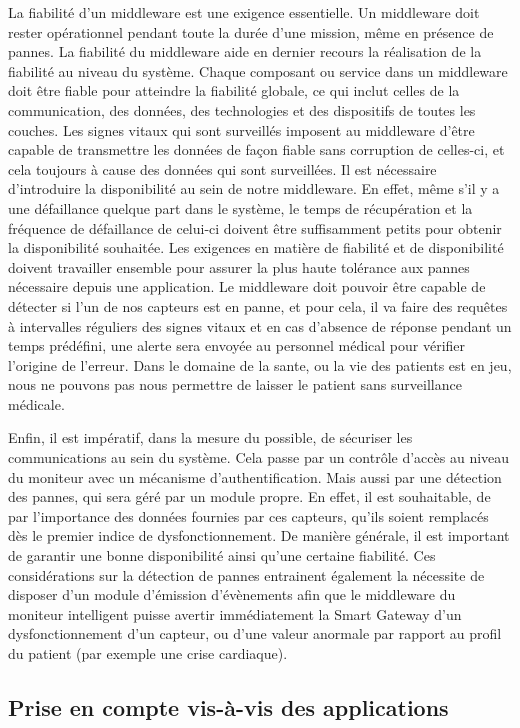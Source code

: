 La fiabilité d’un middleware est une exigence essentielle. Un middleware doit rester opérationnel pendant toute la durée d’une mission, même en présence de pannes. La fiabilité du middleware aide en dernier recours la réalisation de la fiabilité au niveau du système. Chaque composant ou service dans un middleware doit être fiable pour atteindre la fiabilité globale, ce qui inclut celles de la communication, des données, des technologies et des dispositifs de toutes les couches. Les signes vitaux qui sont surveillés imposent au middleware d’être capable de transmettre les données de façon fiable sans corruption de celles-ci, et cela toujours à cause des données qui sont surveillées. Il est nécessaire d’introduire la disponibilité au sein de notre middleware. En effet, même s’il y a une défaillance quelque part dans le système, le temps de récupération et la fréquence de défaillance de celui-ci doivent être suffisamment petits pour obtenir la disponibilité souhaitée. Les exigences en matière de fiabilité et de disponibilité doivent travailler ensemble pour assurer la plus haute tolérance aux pannes nécessaire depuis une application. Le middleware doit pouvoir être capable de détecter si l’un de nos capteurs est en panne, et pour cela, il va faire des requêtes à intervalles réguliers des signes vitaux et en cas d’absence de réponse pendant un temps prédéfini, une alerte sera envoyée au personnel médical pour vérifier l’origine de l’erreur. Dans le domaine de la sante, ou la vie des patients est en jeu, nous ne pouvons pas nous permettre de laisser le patient sans surveillance médicale.
 
Enfin, il est impératif, dans la mesure du possible, de sécuriser les communications au sein du système. Cela passe par un contrôle d’accès au niveau du moniteur avec un mécanisme d’authentification. Mais aussi par une détection des pannes, qui sera géré par un module propre. En effet, il est souhaitable, de par l’importance des données fournies par ces capteurs, qu’ils soient remplacés dès le premier indice de dysfonctionnement. De manière générale, il est important de garantir une bonne disponibilité ainsi qu’une certaine fiabilité. Ces considérations sur la détection de pannes entrainent également la nécessite de disposer d’un module d’émission d’évènements afin que le middleware du moniteur intelligent puisse avertir immédiatement la Smart Gateway d’un dysfonctionnement d’un capteur, ou d’une valeur anormale par rapport au profil du patient (par exemple une crise cardiaque).
 
\subsection{Prise en compte vis-à-vis des applications}
 
